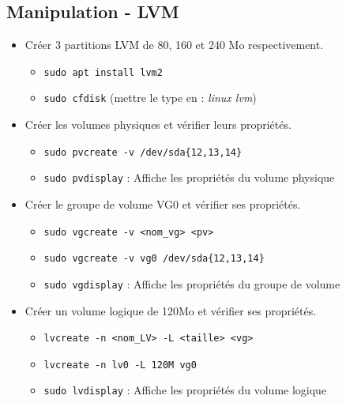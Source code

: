 \documentclass[a4paper]{article}
\begin{document}
\subsection{Manipulation - LVM}





\begin{itemize}

\item Créer 3 partitions LVM de 80, 160 et 240 Mo respectivement.
\begin{example}
    \begin{itemize}
        \item \texttt{sudo apt install lvm2}
        \item \texttt{sudo cfdisk} (mettre le type en : \textit{linux lvm})
    \end{itemize}
\end{example}

\item Créer les volumes physiques et vérifier leurs propriétés.
\begin{example}
    \begin{itemize}
        \item \texttt{sudo pvcreate -v /dev/sda\{12,13,14\}}
        \item \texttt{sudo pvdisplay} : Affiche les propriétés du volume physique
    \end{itemize}
\end{example}

\item Créer le groupe de volume VG0 et vérifier ses propriétés.
\begin{example}
    \begin{itemize}
        \item \texttt{sudo vgcreate -v <nom\_vg> <pv>}
        \item \texttt{sudo vgcreate -v vg0 /dev/sda\{12,13,14\}}
        \item \texttt{sudo vgdisplay} : Affiche les propriétés du groupe de volume
    \end{itemize}
\end{example}

\item Créer un volume logique de 120Mo et vérifier ses propriétés.
\begin{example}
    \begin{itemize}
        \item \texttt{lvcreate -n <nom\_LV> -L <taille> <vg>}
        \item \texttt{lvcreate -n lv0 -L 120M vg0}
        \item \texttt{sudo lvdisplay} : Affiche les propriétés du volume logique
    \end{itemize}
\end{example}


\end{itemize}
\end{document}
